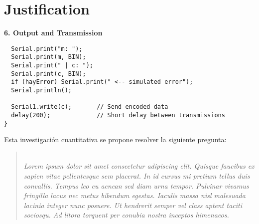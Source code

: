 \section{Justification}

\vspace{0.3cm}
\textbf{6. Output and Transmission}
\begin{lstlisting}
  Serial.print("m: ");
  Serial.print(m, BIN);
  Serial.print(" | c: ");
  Serial.print(c, BIN);
  if (hayError) Serial.print(" <-- simulated error");
  Serial.println();

  Serial1.write(c);       // Send encoded data
  delay(200);             // Short delay between transmissions
}
\end{lstlisting}

Esta investigación cuantitativa se propone resolver la siguiente pregunta:
\begin{quotation}
  \textit{\\Lorem ipsum dolor sit amet consectetur adipiscing elit. Quisque faucibus ex sapien vitae pellentesque sem placerat. In id cursus mi pretium tellus duis convallis. Tempus leo eu aenean sed diam urna tempor. Pulvinar vivamus fringilla lacus nec metus bibendum egestas. Iaculis massa nisl malesuada lacinia integer nunc posuere. Ut hendrerit semper vel class aptent taciti sociosqu. Ad litora torquent per conubia nostra inceptos himenaeos. }
\end{quotation}

